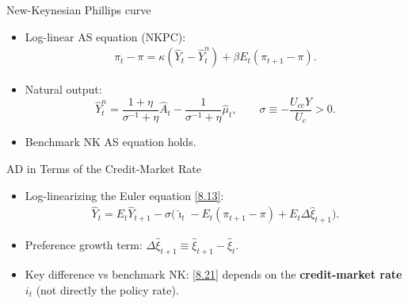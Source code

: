 \documentclass[11pt,aspectratio=169]{beamer}
\begin{document}
\begin{frame}{New-Keynesian Phillips curve}
\begin{itemize}
  \item Log-linear AS equation (NKPC):
  \begin{align}
    \pi_t - \pi
    = \kappa(\hat Y_t - \hat Y_t^n)
    + \beta E_t(\pi_{t+1}-\pi). \label{8.20}
  \end{align}
  \item Natural output:
  \[
    \hat Y_t^n
    = \frac{1+\eta}{\sigma^{-1}+\eta}\hat A_t
      -\frac{1}{\sigma^{-1}+\eta}\hat\mu_t,
    \qquad
    \sigma \equiv -\frac{U_{cc}Y}{U_c}>0.
  \]
  \item Benchmark NK AS equation holds.
\end{itemize}
\end{frame}

\begin{frame}{AD in Terms of the Credit-Market Rate}
\begin{itemize}
  \item Log-linearizing the Euler equation \eqref{8.13}:
  \begin{align}
    \hat Y_t
    = E_t\hat Y_{t+1}
      - \sigma\Big(\hat\imath_t
      - E_t(\pi_{t+1}-\pi)
      + E_t\Delta\hat\xi_{t+1}\Big). \label{8.21}
  \end{align}
  \item Preference growth term: $\Delta\hat\xi_{t+1}\equiv \hat\xi_{t+1}-\hat\xi_t$.
  \item Key difference vs benchmark NK: \eqref{8.21} depends on the \textbf{credit-market rate} $i_t$ (not directly the policy rate).
\end{itemize}
\end{frame}
\end{document}
